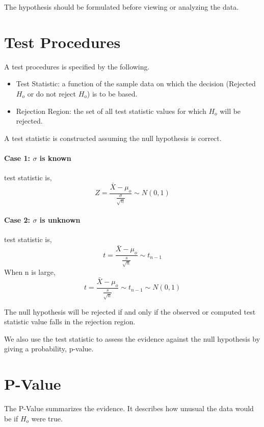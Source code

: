 \documentclass{article}
\begin{document}
    The hypothesis should be formulated before viewing or analyzing the data.

    \section*{Test Procedures}
    A test procedures is specified by the following.

    \begin{itemize}
        \item Test Statistic: a function of the sample data on which the decision
        (Rejected $H_{o}$ or do not reject $H_{o}$) is to be based.
        \item Rejection Region: the set of all test statistic values for which $H_{o}$ will be rejected.
    \end{itemize}

    A test statistic is constructed assuming the null hypothesis is correct.

    \paragraph*{Case 1: $\sigma$ is known}
    test statistic is,
    \begin{equation*}
        Z = \frac{\bar{X} - \mu_{o}}{\frac{\sigma}{\sqrt{n}}} \sim N(0, 1)
    \end{equation*}

    \paragraph*{Case 2: $\sigma$ is unknown}
    test statistic is,
    \begin{equation*}
        t = \frac{\bar{X} - \mu_{o}}{\frac{s}{\sqrt{n}}} \sim t_{n-1}
    \end{equation*}
    When n is large,
    \begin{equation*}
        t = \frac{\bar{X} - \mu_{o}}{\frac{s}{\sqrt{n}}} \sim t_{n-1} \sim N(0,1)
    \end{equation*}

    The null hypothesis will be rejected if and 
    only if the observed or computed test statistic value falls in the rejection region.\par

    We also use the test statistic to assess the evidence against the 
    null hypothesis by giving a probability, p-value.

    \section*{P-Value}
    The P-Value summarizes the evidence. It describes how unusual the 
    data would be if $H_{o}$ were true.\par
    
\end{document}

